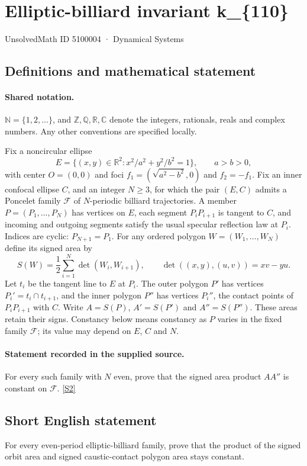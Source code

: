 \documentclass[11pt]{article}
\newcommand{\sref}[2]{\hyperlink{source:#1:#2}{[S#2]}}
\begin{document}
\setcounter{section}{5100003}
\section{Elliptic-billiard invariant k\_\{110\}}\label{5100004}
{\small\sffamily UnsolvedMath ID 5100004 · Dynamical Systems}
\subsection{Definitions and mathematical statement}

\paragraph{Shared notation.}$\mathbb N=\{1,2,\ldots\}$, and $\mathbb Z,\mathbb Q,\mathbb R,\mathbb C$ denote the integers, rationals, reals and complex numbers. Any other conventions are specified locally.


Fix a noncircular ellipse
\[
E=\{(x,y)\in\mathbb R^2:x^2/a^2+y^2/b^2=1\},\qquad a>b>0,
\]
with center $O=(0,0)$ and foci $f_1=(\sqrt{a^2-b^2},0)$ and $f_2=-f_1$. Fix an inner confocal ellipse $C$, and an integer $N\geq3$, for which the pair $(E,C)$ admits a Poncelet family $\mathcal F$ of $N$-periodic billiard trajectories. A member $P=(P_1,\ldots,P_N)$ has vertices on $E$, each segment $P_iP_{i+1}$ is tangent to $C$, and incoming and outgoing segments satisfy the usual specular reflection law at $P_i$. Indices are cyclic: $P_{N+1}=P_1$.
For any ordered polygon $W=(W_1,\ldots,W_N)$ define its signed area by
\[
S(W)=\frac12\sum_{i=1}^N\det(W_i,W_{i+1}),\qquad
\det((x,y),(u,v))=xv-yu.
\]
Let $t_i$ be the tangent line to $E$ at $P_i$. The outer polygon $P'$ has vertices $P_i'=t_i\cap t_{i+1}$, and the inner polygon $P''$ has vertices $P_i''$, the contact points of $P_iP_{i+1}$ with $C$. Write $A=S(P)$, $A'=S(P')$ and $A''=S(P'')$. These areas retain their signs. Constancy below means constancy as $P$ varies in the fixed family $\mathcal F$; its value may depend on $E$, $C$ and $N$.

\paragraph{Statement recorded in the supplied source.}
For every such family with $N$ even, prove that the signed area product $A A''$ is constant on $\mathcal F$. \sref{5100004}{2}
\subsection{Short English statement}
For every even-period elliptic-billiard family, prove that the product of the signed orbit area and signed caustic-contact polygon area stays constant.
\end{document}
